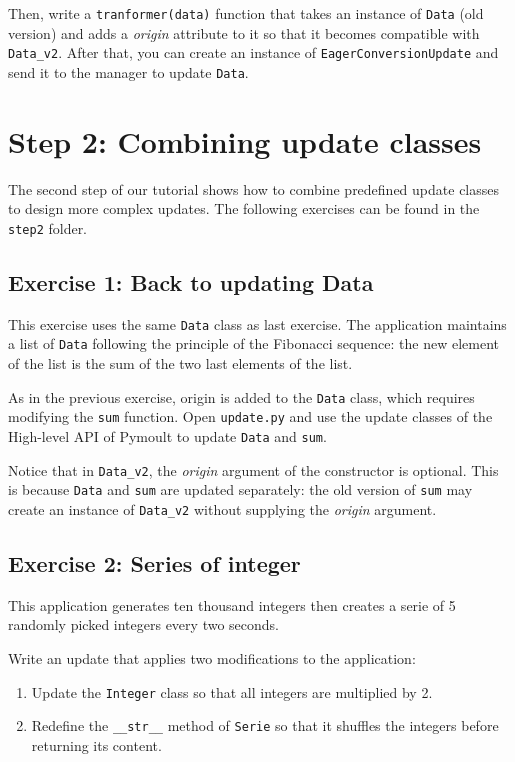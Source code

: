\documentclass{article}
\begin{document}
Then, write a \texttt{tranformer(data)} function that takes an
instance of \texttt{Data} (old version) and adds a \textit{origin}
attribute to it so that it becomes compatible with
\texttt{Data\_v2}. After that, you can create an instance of
\texttt{EagerConversionUpdate} and send it to the manager to update
\texttt{Data}.

\section{Step 2: Combining update classes} 

The second step of our tutorial shows how to combine predefined update
classes to design more complex updates. The following exercises can be
found in the \texttt{step2} folder.

\subsection{Exercise 1: Back to updating Data}

This exercise uses the same \texttt{Data} class as last exercise. The
application maintains a list of \texttt{Data} following the principle
of the Fibonacci sequence: the new element of the list is the sum of
the two last elements of the list.

As in the previous exercise, origin is added to the \texttt{Data}
class, which requires modifying the \texttt{sum} function. Open
\texttt{update.py} and use the update classes of the High-level API of
Pymoult to update \texttt{Data}  and \texttt{sum}.

Notice that in \texttt{Data\_v2}, the \textit{origin} argument of the
constructor is optional. This is because \texttt{Data} and
\texttt{sum} are updated separately: the old version of \texttt{sum}
may create an instance of \texttt{Data\_v2} without supplying the
\textit{origin} argument.

\subsection{Exercise 2: Series of integer}

This application generates ten thousand integers then creates a serie
of 5 randomly picked integers every two seconds.

Write an update that applies two modifications to the application:

\begin{enumerate}

\item Update the \texttt{Integer} class so that all integers are multiplied by 2.

\item Redefine the \texttt{\_\_str\_\_} method of \texttt{Serie} so that
  it shuffles the integers before returning its content.

\end{enumerate}
\end{document}
